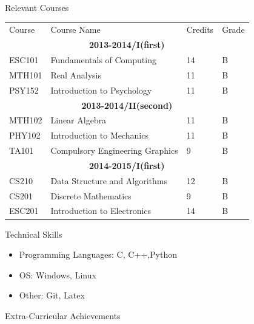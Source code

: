 \documentclass{article}
\begin{document}
\vspace{100pt}	
{\Large Relevant Courses}
\newline
\newline
\begin{tabular}{l l l l}
Course & Course Name & Credits & Grade\\
\multicolumn{4}{c}{\textbf{2013-2014/I(first)}}\\
ESC101& Fundamentals of Computing & 14\hspace{100pt} & B\hspace{10pt} \\ 
MTH101& Real Analysis & 11 & B \\
PSY152& Introduction to Psychology & 11 & B\\
\multicolumn{4}{c}{\textbf{2013-2014/II(second)}}\\ 
MTH102\hspace{30pt} & Linear Algebra & 11 & B\\
PHY102&  Introduction to Mechanics & 11 & B\\
TA101 &  Compulsory Engineering Graphics\hspace{90pt} & 9 & B\\
\multicolumn{4}{c}{\textbf{2014-2015/I(first)}}\\ 
CS210 & Data Structure and Algorithms & 12 & B \\ 
CS201 & Discrete Mathematics & 9 & B\\ 
ESC201 & Introduction to Electronics & 14 & B
\end{tabular}
\newline
\newline
\newline
{\Large Technical Skills}
\begin{itemize}
\item Programming Languages: C, C++,Python
\item OS: Windows, Linux
\item Other: Git, Latex
\end{itemize} 
\vspace{10pt}
{\Large Extra-Curricular Achievements}
\end{document}
